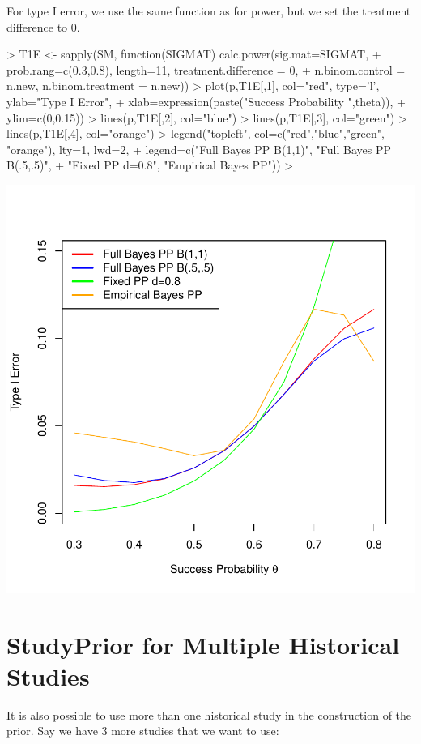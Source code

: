 \documentclass{article}
\begin{document}
For type I error, we use the same function as for power, but we set the treatment difference to 0.
\begin{Schunk}
\begin{Sinput}
> T1E <- sapply(SM, function(SIGMAT) calc.power(sig.mat=SIGMAT, 
+          prob.rang=c(0.3,0.8), length=11, treatment.difference = 0,
+          n.binom.control = n.new, n.binom.treatment = n.new))
> plot(p,T1E[,1],  col="red", type='l', ylab="Type I Error",
+      xlab=expression(paste("Success Probability ",theta)),
+      ylim=c(0,0.15))
> lines(p,T1E[,2],  col="blue")
> lines(p,T1E[,3],  col="green")
> lines(p,T1E[,4],  col="orange")
> legend("topleft", col=c("red","blue","green", "orange"), lty=1, lwd=2,
+        legend=c("Full Bayes PP B(1,1)", "Full Bayes PP B(.5,.5)",
+                 "Fixed PP d=0.8", "Empirical Bayes PP"))
> 
\end{Sinput}
\end{Schunk}
\includegraphics{Binomial-TypeIError}




\section{StudyPrior for Multiple Historical Studies}

It is also possible to use more than one historical study in the construction of the prior. Say we have 3 more studies that we want to use:
\end{document}
